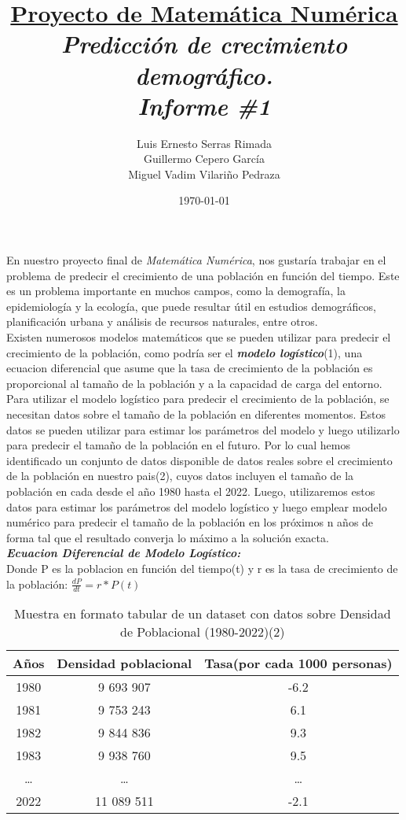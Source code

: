 \documentclass[11pt, letterpaper]{article}
\title{\textbf{\underline{Proyecto de Matemática Numérica}} \\ \textit{Predicción de crecimiento demográfico.} \\ \textit{Informe \#1}}
\author{Luis Ernesto Serras Rimada \\ Guillermo Cepero García \\ Miguel Vadim Vilariño Pedraza}
\date{\today}
\begin{document}
\maketitle
En nuestro proyecto final de \textit{Matemática Numérica}, nos gustaría trabajar en el problema de predecir el crecimiento
de una población en función del tiempo. Este es un problema importante en muchos campos, como la demografía, la
epidemiología y la ecología, que puede resultar útil en estudios demográficos, planificación urbana y análisis de recursos
naturales, entre otros. \\
Existen numerosos modelos matemáticos que se pueden utilizar para predecir el crecimiento de la población, 
como podría ser el \textit{\textbf{modelo logístico}}(1), una ecuacion diferencial que asume que la tasa
de crecimiento de la población es proporcional al tamaño de la población y a la capacidad de carga del entorno.
Para utilizar el modelo logístico para predecir el crecimiento de la población, se necesitan datos sobre el tamaño
de la población en diferentes momentos. Estos datos se pueden utilizar para estimar los parámetros del modelo y
luego utilizarlo para predecir el tamaño de la población en el futuro. Por lo cual hemos identificado un
conjunto de datos disponible de datos reales sobre el crecimiento de la población en nuestro pais(2), cuyos datos
incluyen el tamaño de la población en cada desde el año 1980 hasta el 2022. Luego, utilizaremos estos datos para estimar los parámetros del modelo logístico y luego emplear modelo numérico para 
predecir el tamaño de la población en los próximos n años de forma tal que el resultado converja lo máximo a la 
solución exacta.\\
\textit{\textbf{Ecuacion Diferencial de Modelo Logístico:}}\\
Donde P es la poblacion en función del tiempo(t) y r es la tasa de crecimiento de la población:
$\frac{dP}{dt} = r * P(t)$
\\
\begin{table}[t]
    \begin{center}
        \begin{tabular}{| c | c | c |}\hline \hline
            \textbf{Años} & \textbf{Densidad poblacional} & \textbf{Tasa(por cada 1000 personas)}}\\ \hline \hline
            1980 & 9 693 907 & -6.2\\
            1981 & 9 753 243 & 6.1\\
            1982 & 9 844 836 & 9.3\\
            1983 & 9 938 760 & 9.5\\
            \dots & \dots & \dots\\
            2022 & 11 089 511 & -2.1\\ \hline
        \end{tabular}
        \caption{Muestra en formato tabular de un dataset con datos sobre Densidad de Poblacional (1980-2022)(2)}
        \label{tab:años}
    \end{center}
\end{table}
\end{document}
